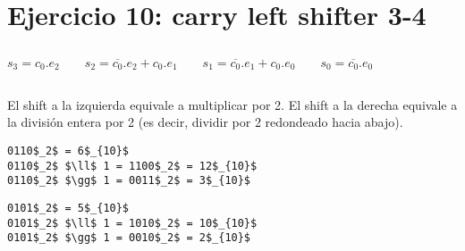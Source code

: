 \begin{figure}[ht]
    
\end{figure}

\subsection{}

\begin{figure}[ht]
    
\end{figure}

\pagebreak

\section{Ejercicio 10: carry left shifter 3-4}

\subsection{}

$
s_3 = c_0 . e_2
\hspace{2em}
s_2 = \overline{c_0} . e_2 + c_0 . e_1
\hspace{2em}
s_1 = \overline{c_0} . e_1 + c_0 . e_0
\hspace{2em}
s_0 = \overline{c_0} . e_0
$

\begin{figure}[ht]
    
\end{figure}

\subsection{}

El shift a la izquierda equivale a multiplicar por 2. El shift a la derecha equivale a la división entera por 2 (es decir, dividir por 2 redondeado hacia abajo).

\begin{lstlisting}
0110$_2$ = 6$_{10}$
0110$_2$ $\ll$ 1 = 1100$_2$ = 12$_{10}$
0110$_2$ $\gg$ 1 = 0011$_2$ = 3$_{10}$
\end{lstlisting}

\begin{lstlisting}
0101$_2$ = 5$_{10}$
0101$_2$ $\ll$ 1 = 1010$_2$ = 10$_{10}$
0101$_2$ $\gg$ 1 = 0010$_2$ = 2$_{10}$
\end{lstlisting}

\pagebreak


